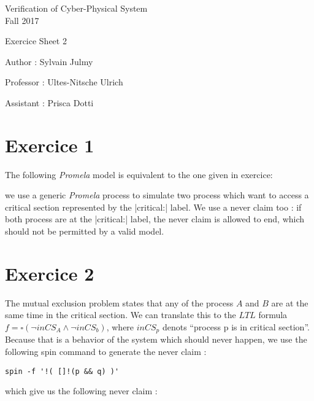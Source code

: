 \documentclass[a4paper,11pt]{report}
\author{Sylvain Julmy}
\date{\today}
\newcommand{\ex}[3]{\cfile[firstline=#1,lastline=#2]{ex#3.pml}}
\begin{document}
\begin{center}
\Large{
    Verification of Cyber-Physical System\\
    Fall 2017
  }
  
  \noindent\makebox[\linewidth]{\rule{\linewidth}{0.4pt}}
  Exercice Sheet 2

  \vspace*{1.4cm}

  Author : Sylvain Julmy
  \noindent\makebox[\linewidth]{\rule{\linewidth}{0.4pt}}

  \begin{flushleft}
    Professor : Ultes-Nitsche Ulrich
    
    Assistant : Prisca Dotti
  \end{flushleft}

  \noindent\makebox[\linewidth]{\rule{\textwidth}{1pt}}
\end{center}

\section*{Exercice 1}

The following \textit{Promela} model is equivalent to the one given in exercice:

\ex{8}{42}{1}

we use a generic \textit{Promela} process to simulate two process which want to
access a critical section represented by the \promelainline|critical:| label. We
use a never claim too : if both process are at the \promelainline|critical:|
label, the never claim is allowed to end, which should not be permitted by a
valid model.

\section*{Exercice 2}

The mutual exclusion problem states that any of the process $A$ and $B$ are at
the same time in the critical section. We can translate this to the $LTL$
formula $f = \square (\neg inCS_A \wedge \neg inCS_b)$, where $inCS_p$ denots
``process p is in critical section''. Because that is a
behavior of the system which should never happen, we use the following spin
command to generate the never claim :

\begin{verbatim}
spin -f '!( []!(p && q) )'
\end{verbatim}

which give us the following never claim :
\end{document}
